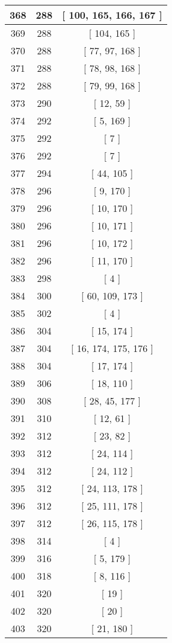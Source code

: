 \begin{center}
\begin{longtable}[H]{|| c c c ||}
368 & 288 & [ 100, 165, 166, 167 ]
\\\hline
369 & 288 & [ 104, 165 ]
\\\hline
370 & 288 & [ 77, 97, 168 ]
\\\hline
371 & 288 & [ 78, 98, 168 ]
\\\hline
372 & 288 & [ 79, 99, 168 ]
\\\hline
373 & 290 & [ 12, 59 ]
\\\hline
374 & 292 & [ 5, 169 ]
\\\hline
375 & 292 & [ 7 ]
\\\hline
376 & 292 & [ 7 ]
\\\hline
377 & 294 & [ 44, 105 ]
\\\hline
378 & 296 & [ 9, 170 ]
\\\hline
379 & 296 & [ 10, 170 ]
\\\hline
380 & 296 & [ 10, 171 ]
\\\hline
381 & 296 & [ 10, 172 ]
\\\hline
382 & 296 & [ 11, 170 ]
\\\hline
383 & 298 & [ 4 ]
\\\hline
384 & 300 & [ 60, 109, 173 ]
\\\hline
385 & 302 & [ 4 ]
\\\hline
386 & 304 & [ 15, 174 ]
\\\hline
387 & 304 & [ 16, 174, 175, 176 ]
\\\hline
388 & 304 & [ 17, 174 ]
\\\hline
389 & 306 & [ 18, 110 ]
\\\hline
390 & 308 & [ 28, 45, 177 ]
\\\hline
391 & 310 & [ 12, 61 ]
\\\hline
392 & 312 & [ 23, 82 ]
\\\hline
393 & 312 & [ 24, 114 ]
\\\hline
394 & 312 & [ 24, 112 ]
\\\hline
395 & 312 & [ 24, 113, 178 ]
\\\hline
396 & 312 & [ 25, 111, 178 ]
\\\hline
397 & 312 & [ 26, 115, 178 ]
\\\hline
398 & 314 & [ 4 ]
\\\hline
399 & 316 & [ 5, 179 ]
\\\hline
400 & 318 & [ 8, 116 ]
\\\hline
401 & 320 & [ 19 ]
\\\hline
402 & 320 & [ 20 ]
\\\hline
403 & 320 & [ 21, 180 ]
\\\hline

\end{longtable}
\end{center}
